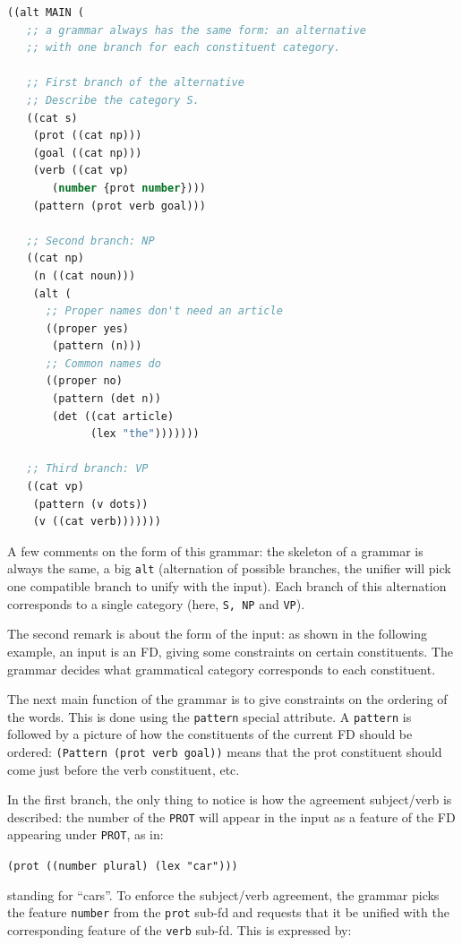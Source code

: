 \documentclass[10pt,a4paper]{report}
\begin{document}
 

\begin{lstlisting}[language=Lisp]
((alt MAIN ( 
   ;; a grammar always has the same form: an alternative
   ;; with one branch for each constituent category.

   ;; First branch of the alternative 
   ;; Describe the category S.
   ((cat s)
    (prot ((cat np)))
    (goal ((cat np)))
    (verb ((cat vp)
	   (number {prot number})))
    (pattern (prot verb goal)))

   ;; Second branch: NP
   ((cat np)
    (n ((cat noun)))
    (alt (
      ;; Proper names don't need an article
      ((proper yes)
       (pattern (n)))
      ;; Common names do
      ((proper no)
       (pattern (det n))
       (det ((cat article)
             (lex "the")))))))

   ;; Third branch: VP
   ((cat vp)
    (pattern (v dots))
    (v ((cat verb)))))))
\end{lstlisting}

A few comments on the form of this grammar: the skeleton of a
grammar is always the same, a big {\tt alt} (alternation of possible
branches, the unifier will pick one compatible branch to unify
with the input). Each branch of this alternation corresponds to a single
category (here, {\tt S, NP} and {\tt VP}). 

The second remark is about the form of the input: as shown in the
following example, an input is an FD, giving some constraints on
certain constituents. The grammar decides what grammatical
category corresponds to each constituent. 

The next main function of the grammar is to give constraints on
the ordering of the words. This is done using the {\tt pattern} special
attribute. A {\tt pattern} is followed by a picture of how the
constituents of the current FD should be ordered: {\tt (Pattern (prot
verb goal))} means that the prot constituent should come just
before the verb constituent, etc. 

In the first branch, the only thing to notice is how the
agreement subject/verb is described: the number of the {\tt PROT} will
appear in the input as a feature of the FD appearing under {\tt PROT},
as in: 

{\tt (prot ((number plural)
       (lex "car")))}

standing for ``cars''. To enforce the subject/verb agreement, the
grammar picks the feature {\tt number} from the {\tt prot} sub-fd and
requests that it be unified with the corresponding feature of the
{\tt verb} sub-fd. This is expressed by:
\end{document}
